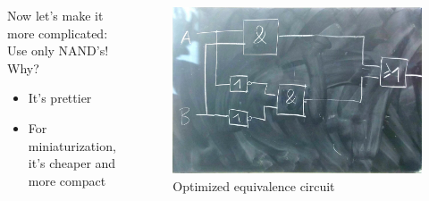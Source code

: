 \documentclass{beamer}
\begin{document}
\begin{frame}
  \begin{columns}
  \begin{column}{5cm}
  Now let's make it more complicated: \newline Use only NAND's! Why?
  \newline
  \begin{itemize}
   \item It's prettier
   \item For miniaturization, it's cheaper and more compact
  \end{itemize}

  \end{column}
  
  \begin{column}{6cm}
    \begin{figure}[H]
      \centering
      \includegraphics[width=1\textwidth]{eq1}%
      \caption{Optimized equivalence circuit}%
      \label{fig:equivalence_optimized}
    \end{figure}
  \end{column}
  \end{columns}  
\end{frame}
\end{document}
